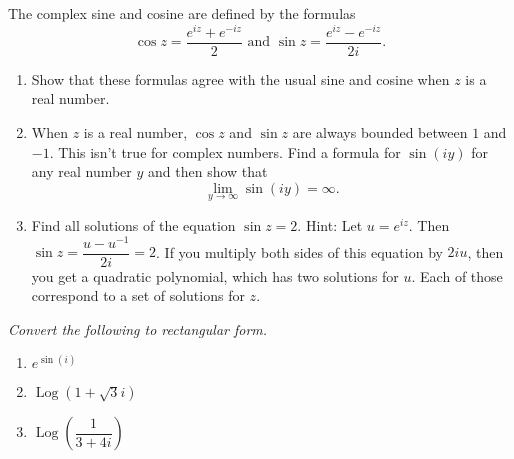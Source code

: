 \documentclass[11pt]{article}
\newcommand{\ds}{\displaystyle}
\newcommand{\Log}{\operatorname{Log}}
\begin{document}
\newpage 
\noindent
The complex sine and cosine are defined by the formulas
$$\cos z = \frac{e^{iz} + e^{-iz}}{2} \text{ and } \sin z = \frac{e^{iz} - e^{-iz}}{2i}.$$ 

\begin{enumerate}
\setcounter{enumi}{\theenumCount}
\item Show that these formulas agree with the usual sine and cosine when $z$ is a real number. 
\vfill

\item When $z$ is a real number, $\cos z$ and $\sin z$ are always bounded between $1$ and $-1$.  This isn't true for complex numbers.  Find a formula for $\sin(iy)$ for any real number $y$ and then show that  
$$\ds \lim_{y \rightarrow \infty} \sin (i y) = \infty.$$
\vfill

\item Find all solutions of the equation $\sin z = 2$. Hint: Let $u = e^{iz}$.  Then $\sin z = \dfrac{u-u^{-1}}{2i} = 2$.  If you multiply both sides of this equation by $2iu$, then you get a quadratic polynomial, which has two solutions for $u$.  Each of those correspond to a set of solutions for $z$. %
\vfill

\setcounter{enumCount}{\theenumi}
\end{enumerate}

\noindent
\textit{Convert the following to rectangular form.}
\begin{multicols}{3}
\begin{enumerate}
\setcounter{enumi}{\theenumCount}
\item $e^{\sin (i)}$
\item $\Log(1+\sqrt{3}i)$
\item $\Log\left(\dfrac{1}{3+4i}\right)$
\setcounter{enumCount}{\theenumi}
\end{enumerate}
\end{multicols}
\vfill
\end{document}

